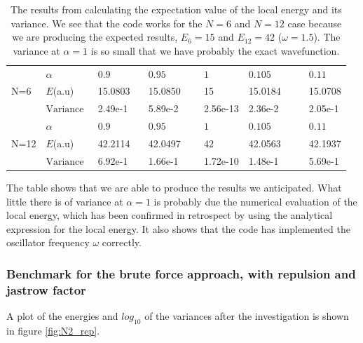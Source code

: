 \begin{table}[h!]
	\centering 
	\begin{tabular}{l @{}l @{ } l @{ } l @{ } l @{ } l @{ } l}
		\toprule
		\multirow{3}{*}{N=6}$~~\quad ~~$ & $\alpha~~~~$ & $0.9~~~~~~~~~~~~~$ & $0.95~~~~~~~~~~~~~$ & $1~~~~~~~~~~~~~$ & $0.105~~~~~~~~~~~~~$  & $0.11$ \\
		 & $E$(a.u) & 15.0803 & 15.0850 & 15 & 15.0184 & 15.0708\\ 
		 & $\textrm{Variance} ~~$ & 2.49e-1 & 5.89e-2 & 2.56e-13 & 2.36e-2 & 2.05e-1\\ 
		\midrule
		\multirow{3}{*}{N=12} & $\alpha~~~~$ & $0.9~~~~$ & $0.95~~~~$ & $1~~~~$ & $0.105~~~~$  & $0.11$ \\
		& $E$(a.u) & 42.2114 & 42.0497 & 42 & 42.0563 & 42.1937 \\ 
		& $\textrm{Variance} ~~$ & 6.92e-1 & 1.66e-1 & 1.72e-10 & 1.48e-1 & 5.69e-1\\ 
		\bottomrule
	\end{tabular}
	\caption{The results from calculating the expectation value of the local energy and its variance.
			We see that the code works for the $N=6$ and $N=12$ case because we are producing the expected results, $E_6 = 15$ and $E_{12} = 42$ ($\omega = 1.5$). 
			The variance at $\alpha=1$ is so small that we have probably the exact wavefunction.}
	\label{tab:N6_N12_norep}
\end{table}

The table shows that we are able to produce the results we anticipated.
What little there is of variance at $\alpha=1$ is probably due the numerical evaluation of the local energy, which has been confirmed in retrospect by using the analytical expression for the local energy. 
It also shows that the code has implemented the oscillator frequency $\omega$ correctly. 










\subsubsection{Benchmark for the brute force approach, with repulsion and jastrow factor}\label{sec:res_N2_rep}

A plot of the energies and $log_{10}$ of the variances after the investigation is shown in figure \ref{fig:N2_rep}.

